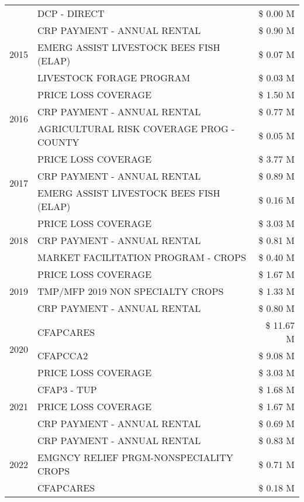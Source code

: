 \begin{tabular}{llr}
 & DCP - DIRECT & \$ 0.00 M \\
\cline{1-3}
\multirow[t]{3}{*}{2015} & CRP PAYMENT - ANNUAL RENTAL & \$ 0.90 M \\
 & EMERG ASSIST LIVESTOCK BEES FISH (ELAP) & \$ 0.07 M \\
 & LIVESTOCK FORAGE PROGRAM & \$ 0.03 M \\
\cline{1-3}
\multirow[t]{3}{*}{2016} & PRICE LOSS COVERAGE & \$ 1.50 M \\
 & CRP PAYMENT - ANNUAL RENTAL & \$ 0.77 M \\
 & AGRICULTURAL RISK COVERAGE PROG - COUNTY & \$ 0.05 M \\
\cline{1-3}
\multirow[t]{3}{*}{2017} & PRICE LOSS COVERAGE & \$ 3.77 M \\
 & CRP PAYMENT - ANNUAL RENTAL & \$ 0.89 M \\
 & EMERG ASSIST LIVESTOCK BEES FISH (ELAP) & \$ 0.16 M \\
\cline{1-3}
\multirow[t]{3}{*}{2018} & PRICE LOSS COVERAGE & \$ 3.03 M \\
 & CRP PAYMENT - ANNUAL RENTAL & \$ 0.81 M \\
 & MARKET FACILITATION PROGRAM - CROPS & \$ 0.40 M \\
\cline{1-3}
\multirow[t]{3}{*}{2019} & PRICE LOSS COVERAGE & \$ 1.67 M \\
 & TMP/MFP 2019 NON SPECIALTY CROPS & \$ 1.33 M \\
 & CRP PAYMENT - ANNUAL RENTAL & \$ 0.80 M \\
\cline{1-3}
\multirow[t]{3}{*}{2020} & CFAPCARES & \$ 11.67 M \\
 & CFAPCCA2 & \$ 9.08 M \\
 & PRICE LOSS COVERAGE & \$ 3.03 M \\
\cline{1-3}
\multirow[t]{3}{*}{2021} & CFAP3 - TUP & \$ 1.68 M \\
 & PRICE LOSS COVERAGE & \$ 1.67 M \\
 & CRP PAYMENT - ANNUAL RENTAL & \$ 0.69 M \\
\cline{1-3}
\multirow[t]{3}{*}{2022} & CRP PAYMENT - ANNUAL RENTAL & \$ 0.83 M \\
 & EMGNCY RELIEF PRGM-NONSPECIALITY CROPS & \$ 0.71 M \\
 & CFAPCARES & \$ 0.18 M \\
\cline{1-3}
\bottomrule
\end{tabular}
